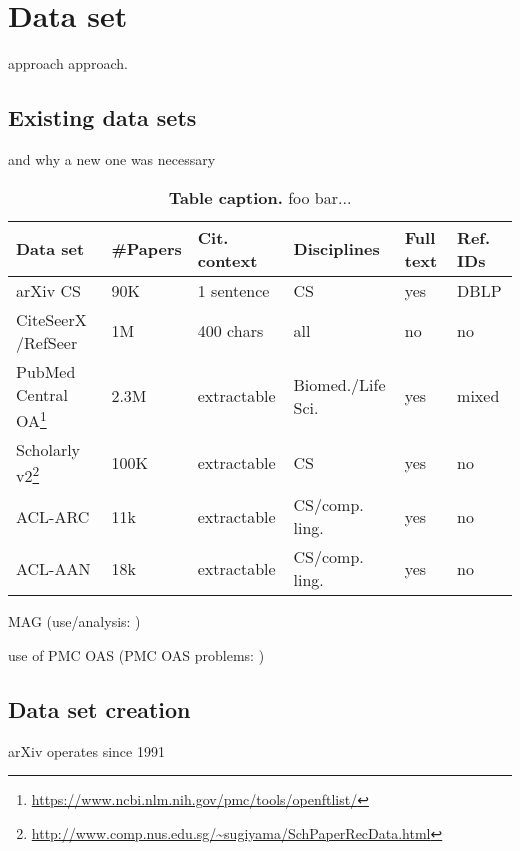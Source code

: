 \chapter{Data set}\label{chap:dataset}
approach approach.

\section{Existing data sets}
and why a new one was necessary

\begin{table}[ht]
\begin{center}
    \begin{tabular}{llllll}
    \toprule
    Data set & \#Papers & Cit. context & Disciplines & Full text & Ref. IDs \\
    \midrule
    arXiv CS    &  90K & 1 sentence & CS & yes & DBLP \\ %
    CiteSeerX /RefSeer  &  1M & 400 chars & all & no & no \\ %
    PubMed Central OA\footnote{\url{https://www.ncbi.nlm.nih.gov/pmc/tools/openftlist/}} & 2.3M & extractable & Biomed./Life Sci. & yes & mixed \\
    Scholarly v2\footnote{\url{http://www.comp.nus.edu.sg/~sugiyama/SchPaperRecData.html}}  & 100K & extractable & CS & yes & no \\
    ACL-ARC  & 11k & extractable & CS/comp. ling. & yes & no \\ %
    ACL-AAN  & 18k & extractable & CS/comp. ling. & yes & no  \\ %
    \bottomrule
    \end{tabular}
\end{center}
    \caption[Table caption]{\textbf{Table caption.} foo bar...\\}
    \label{tab:datasets}
\end{table}

MAG\cite{Sinha2015} (use/analysis: \cite{Herrmannova2016,Paszcza2016,Hug2017})

use of PMC OAS\cite{Gipp2015,Duma2016,Galke2018,Bhagavatula2018} (PMC OAS problems: \cite{Gipp2015})

\section{Data set creation}
arXiv operates since 1991\cite{Ginsparg1994}

